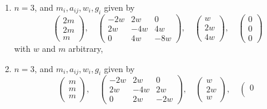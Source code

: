 \begin{lemma}
\begin{enumerate}
$$\begin{matrix}
3w & -6w & 3w \\
0 & 3w & -2w
\end{matrix}
\right),
\quad
\left(
\begin{matrix}
3w \\
3w \\
w
\end{matrix}
\right),
\quad
\left(
\begin{matrix}
0 \\
0 \\
0
\end{matrix}
\right)
$$
with $w$ and $m$ arbitrary,
\item
\label{models-item-up-up}
$n = 3$, and $m_i, a_{ij}, w_i, g_i$ given by
$$
\left(
\begin{matrix}
2m \\
2m \\
m
\end{matrix}
\right),
\quad
\left(
\begin{matrix}
-2w & 2w & 0 \\
2w & -4w & 4w \\
0 & 4w & -8w
\end{matrix}
\right),
\quad
\left(
\begin{matrix}
w \\
2w \\
4w
\end{matrix}
\right),
\quad
\left(
\begin{matrix}
0 \\
0 \\
0
\end{matrix}
\right)
$$
with $w$ and $m$ arbitrary,
\item
\label{models-item-up-down}
$n = 3$, and $m_i, a_{ij}, w_i, g_i$ given by
$$
\left(
\begin{matrix}
m \\
m \\
m
\end{matrix}
\right),
\quad
\left(
\begin{matrix}
-2w & 2w & 0 \\
2w & -4w & 2w \\
0 & 2w & -2w
\end{matrix}
\right),
\quad
\left(
\begin{matrix}
w \\
2w \\
w
\end{matrix}
\right),
\quad
\left(
\begin{matrix}
0 \\

\end{matrix}$$
\end{enumerate}
\end{lemma}

